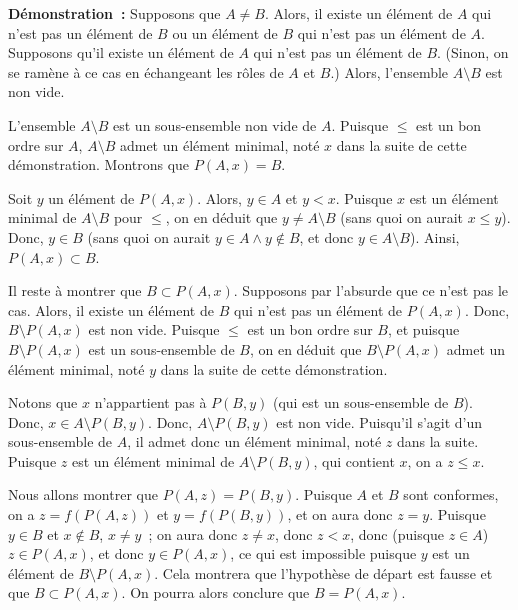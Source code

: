 \medskip

\noindent\textbf{Démonstration :} 
    Supposons que $A \neq B$. 
    Alors, il existe un élément de $A$ qui n'est pas un élément de $B$ ou un élément de $B$ qui n'est pas un élément de $A$.
    Supposons qu'il existe un élément de $A$ qui n'est pas un élément de $B$. 
    (Sinon, on se ramène à ce cas en échangeant les rôles de $A$ et $B$.)
    Alors, l'ensemble $A \setminus B$ est non vide. 

    L'ensemble $A \setminus B$ est un sous-ensemble non vide de $A$. 
    Puisque $\leq$ est un bon ordre sur $A$, $A \setminus B$ admet un élément minimal, noté $x$ dans la suite de cette démonstration.
    Montrons que $P(A, x) = B$.

    Soit $y$ un élément de $P(A,x)$. 
    Alors, $y \in A$ et $y < x$.
    Puisque $x$ est un élément minimal de $A \setminus B$ pour $\leq$, on en déduit que $y \neq A \setminus B$ (sans quoi on aurait $x \leq y$).
    Donc, $y \in B$ (sans quoi on aurait $y \in A \wedge y \notin B$, et donc $y \in A \setminus B$).
    Ainsi, $P(A,x) \subset B$.

    Il reste à montrer que $B \subset P(A,x)$. 
    Supposons par l'absurde que ce n'est pas le cas. 
    Alors, il existe un élément de $B$ qui n'est pas un élément de $P(A,x)$. 
    Donc, $B \setminus P(A, x)$ est non vide.
    Puisque $\leq$ est un bon ordre sur $B$, et puisque $B \setminus P(A,x)$ est un sous-ensemble de $B$, on en déduit que $B \setminus P(A,x)$ admet un élément minimal, noté $y$ dans la suite de cette démonstration.

    Notons que $x$ n'appartient pas à $P(B, y)$ (qui est un sous-ensemble de $B$). 
    Donc, $x \in A \setminus P(B,y)$. 
    Donc, $A \setminus P(B,y)$ est non vide. 
    Puisqu'il s'agit d'un sous-ensemble de $A$, il admet donc un élément minimal, noté $z$ dans la suite. 
    Puisque $z$ est un élément minimal de $A \setminus P(B,y)$, qui contient $x$, on a $z \leq x$. 

    Nous allons montrer que $P(A,z) = P(B,y)$. 
    Puisque $A$ et $B$ sont conformes, on a $z = f(P(A,z))$ et $y = f(P(B,y))$, et on aura donc $z = y$.
    Puisque $y \in B$ et $x \notin B$, $x \neq y$ ; on aura donc $z \neq x$, donc $z < x$, donc (puisque $z \in A$) $z \in P(A,x)$, et donc $y \in P(A,x)$, ce qui est impossible puisque $y$ est un élément de $B \setminus P(A,x)$. 
    Cela montrera que l'hypothèse de départ est fausse et que $B \subset P(A,x)$. 
    On pourra alors conclure que $B = P(A,x)$.

